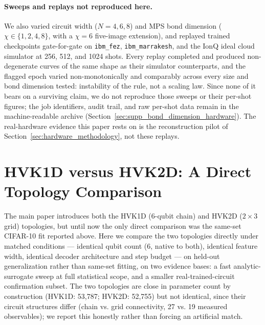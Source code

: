 \documentclass[11pt]{article}
\begin{document}
\paragraph{Sweeps and replays not reproduced here.} We also varied circuit width ($N=4,6,8$) and MPS bond dimension ($\chi\in\{1,2,4,8\}$, with a $\chi=6$ five-image extension), and replayed trained checkpoints gate-for-gate on \texttt{ibm\_fez}, \texttt{ibm\_marrakesh}, and the IonQ ideal cloud simulator \cite{IonQBackends} at 256, 512, and 1024 shots. Every replay completed and produced non-degenerate curves of the same shape as their simulator counterparts, and the flagged epoch varied non-monotonically and comparably across every size and bond dimension tested: instability of the rule, not a scaling law. Since none of it bears on a surviving claim, we do not reproduce those sweeps or their per-shot figures; the job identifiers, audit trail, and raw per-shot data remain in the machine-readable archive (Section~\ref{sec:supp_bond_dimension_hardware}). The real-hardware evidence this paper rests on is the reconstruction pilot of Section~\ref{sec:hardware_methodology}, not these replays.
\section{HVK1D versus HVK2D: A Direct Topology Comparison}
\label{sec:topology_comparison}
The main paper introduces both the HVK1D (6-qubit chain) and HVK2D ($2\times3$ grid) topologies, but until now the only direct comparison was the same-set CIFAR-10 fit reported above. Here we compare the two topologies directly under matched conditions --- identical qubit count (6, native to both), identical feature width, identical decoder architecture and step budget --- on held-out generalization rather than same-set fitting, on two evidence bases: a fast analytic-surrogate sweep at full statistical scope, and a smaller real-trained-circuit confirmation subset. The two topologies are close in parameter count by construction (HVK1D: 53{,}787; HVK2D: 52{,}755) but not identical, since their circuit structures differ (chain vs. grid connectivity, 27 vs. 19 measured observables); we report this honestly rather than forcing an artificial match.
\end{document}
